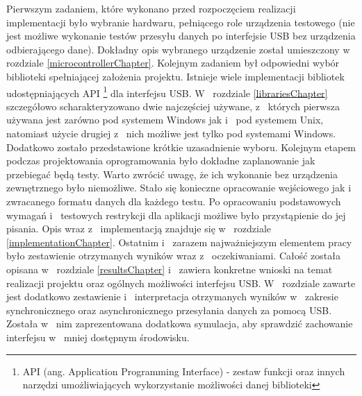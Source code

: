 \documentclass{BscUS}
\begin{document}
\newline
\indent Pierwszym zadaniem, które wykonano przed rozpoczęciem realizacji implementacji było wybranie hardwaru, pełniącego role urządzenia testowego (nie jest możliwe wykonanie testów przesyłu danych po interfejsie USB bez urządzenia odbierającego dane). Dokładny opis wybranego urządzenie został umieszczony w~ rozdziale \ref{microcontrollerChapter}. Kolejnym zadaniem był odpowiedni wybór biblioteki spełniającej założenia projektu. Istnieje wiele implementacji bibliotek udostępniających API \footnote{API (ang. Application Programming Interface) - zestaw funkcji oraz innych narzędzi umożliwiających wykorzystanie możliwości danej biblioteki} dla interfejsu USB. W~ rozdziale \ref{librariesChapter} szczegółowo scharakteryzowano dwie najczęściej używane, z~ których pierwsza używana jest zarówno pod systemem Windows jak i~ pod systemem Unix, natomiast użycie drugiej z~ nich możliwe jest tylko pod systemami Windows. Dodatkowo zostało przedstawione krótkie uzasadnienie wyboru.
\newline
\indent Kolejnym etapem podczas projektowania oprogramowania było dokładne zaplanowanie jak przebiegać będą testy. Warto zwrócić uwagę, że ich wykonanie bez urządzenia zewnętrznego było niemożliwe. Stało się konieczne opracowanie wejściowego jak i~ zwracanego formatu danych dla każdego testu. Po opracowaniu podstawowych wymagań i~ testowych restrykcji dla aplikacji możliwe było przystąpienie do jej pisania. Opis wraz z~ implementacją znajduje się w~ rozdziale \ref{implementationChapter}.
\newline
\indent Ostatnim i~ zarazem najważniejszym elementem pracy było zestawienie otrzymanych wyników wraz z~ oczekiwaniami. Całość została opisana w~ rozdziale \ref{resultsChapter} i~ zawiera konkretne wnioski na temat realizacji projektu oraz ogólnych możliwości interfejsu USB. W~ rozdziale zawarte jest dodatkowo zestawienie i~ interpretacja otrzymanych wyników w~ zakresie synchronicznego oraz asynchronicznego przesyłania danych za pomocą USB. Została w~ nim zaprezentowana dodatkowa symulacja, aby sprawdzić zachowanie interfejsu w~ mniej dostępnym środowisku.

\end{document}
